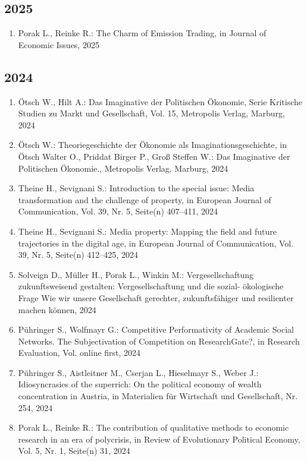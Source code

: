 \subsection*{2025}
\begin{enumerate}
    	 \item Porak L., Reinke R.: The Charm of Emission Trading, in Journal of Economic Issues, 2025
\end{enumerate}
\subsection*{2024}
\begin{enumerate}
    	 \item Ötsch W., Hilt A.: Das Imaginative der Politischen Ökonomie, Serie Kritische Studien zu Markt und Gesellschaft, Vol. 15, Metropolis Verlag, Marburg, 2024
	 \item Ötsch W.: Theoriegeschichte der Ökonomie als Imaginationsgeschichte, in Ötsch Walter O., Priddat Birger P., Groß Steffen W.: Das Imaginative der Politischen Ökonomie., Metropolis Verlag, Marburg, 2024
	 \item Theine H., Sevignani S.: Introduction to the special issue: Media transformation and the challenge of property, in European Journal of Communication, Vol. 39, Nr. 5, Seite(n) 407–411, 2024
	 \item Theine H., Sevignani S.: Media property: Mapping the field and future trajectories in the digital age, in European Journal of Communication, Vol. 39, Nr. 5, Seite(n) 412–425, 2024
	 \item Solveign D., Müller H., Porak L., Winkin M.: Vergesellschaftung zukunftsweisend gestalten: Vergesellschaftung und die sozial- ökologische Frage Wie wir unsere Gesellschaft gerechter, zukunftsfähiger und resilienter machen können, 2024
	 \item Pühringer S., Wolfmayr G.: Competitive Performativity of Academic Social Networks. The Subjectivation of Competition on ResearchGate?, in Research Evaluation, Vol. online first, 2024
	 \item Pühringer S., Aistleitner M., Cserjan L., Hieselmayr S., Weber J.: Idiosyncrasies of the superrich: On the political economy of wealth concentration in Austria, in Materialien für Wirtschaft und Gesellschaft, Nr. 254, 2024
	 \item Porak L., Reinke R.: The contribution of qualitative methods to economic research in an era of polycrisis, in Review of Evolutionary Political Economy, Vol. 5, Nr. 1, Seite(n) 31, 2024

\end{enumerate}
